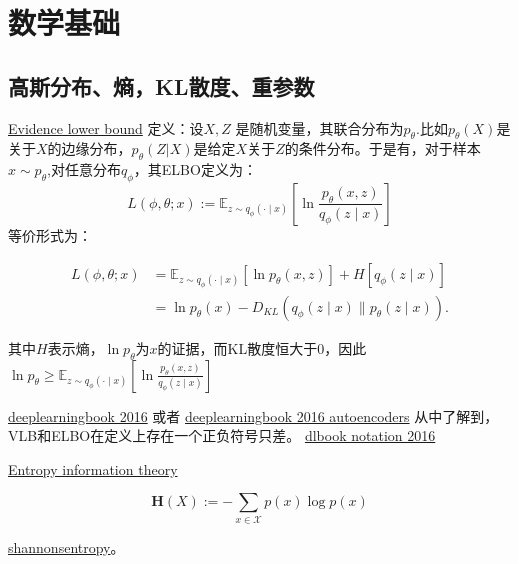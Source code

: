 \documentclass[lang=cn,newtx,10pt,scheme=chinese]{elegantbook}
\begin{document}
\chapter{数学基础}

\section{高斯分布、熵，KL散度、重参数}

\href{https://en.wikipedia.org/wiki/Evidence_lower_bound}{Evidence lower bound}
定义：设$X, Z$ 是随机变量，其联合分布为$p_{\theta}$.比如$p_{\theta}(X)$是关于$X$的边缘分布，$p_{\theta}(Z|X)$是给定$X$关于$Z$的条件分布。于是有，对于样本$x \sim p_{\theta}$,对任意分布$q_{\phi}$，其ELBO定义为：
\begin{equation}
L(\phi, \theta ; x):=\mathbb{E}_{z \sim q_\phi(\cdot \mid x)}\left[\ln \frac{p_\theta(x, z)}{q_\phi(z \mid x)}\right]
\end{equation}
等价形式为：

\begin{equation}
\begin{aligned}
L(\phi, \theta ; x) & 
=\mathbb{E}_{z \sim q_\phi(\cdot \mid x)}\left[\ln p_\theta(x, z)
\right]+H\left[q_\phi(z \mid x)\right] \\ & 
=\ln p_\theta(x)-D_{K L}\left(q_\phi(z \mid x) \| p_\theta(z \mid x)\right) .
\end{aligned}
\end{equation}

其中$H$表示熵，$\ln p_{\theta}$为$x$的证据，而KL散度恒大于0，因此
$\ln p_{\theta} \geq \mathbb{E}_{z \sim q_\phi(\cdot \mid x)}
\left[\ln \frac{p_\theta(x, z)}{q_\phi(z \mid x)}\right]
$

\href{https://github.com/janishar/mit-deep-learning-book-pdf}{deeplearningbook 2016} 或者
\href{https://www.deeplearningbook.org/contents/autoencoders.html}{deeplearningbook 2016 autoencoders} 
从中了解到，VLB和ELBO在定义上存在一个正负符号只差。
\href{https://github.com/goodfeli/dlbook_notation}{dlbook notation 2016}

\href{https://www.inf.ed.ac.uk/teaching/courses/fmcs1/slides/lecture25.pdf}
\href{https://en.wikipedia.org/wiki/Entropy\_(information\_theory)}{Entropy information theory }

\begin{equation}
\mathbf{H}(X):=-\sum_{x \in \mathcal{X}} p(x) \log p(x)
\end{equation}

\href{https://planetmath.org/shannonsentropy}{shannonsentropy}。
\end{document}
